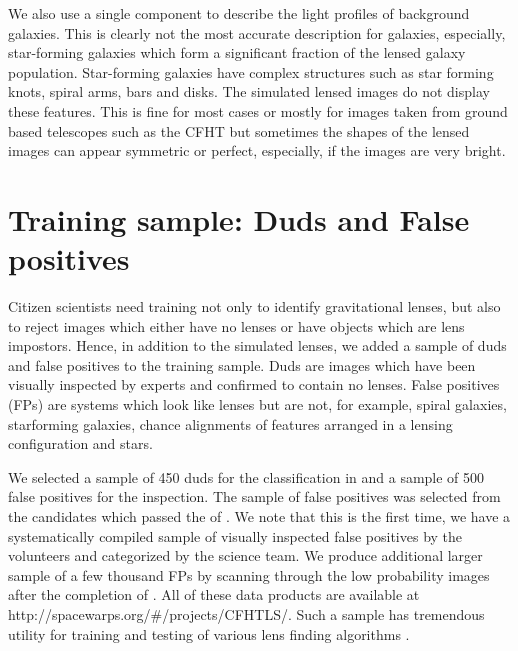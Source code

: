 \documentclass[useAMS,usenatbib,a4paper]{mn2e}
\begin{document}
We also use a single component to describe the light profiles of
background galaxies. This is clearly not the most accurate description for
galaxies, especially, star-forming galaxies which form a significant fraction
of the lensed galaxy population. Star-forming galaxies have complex structures
such as star forming knots, spiral arms, bars and disks. The simulated lensed
images do not display these features. This is fine for most cases or
mostly for images taken from ground based telescopes such as the CFHT
but sometimes the shapes of the lensed images can appear symmetric or
perfect, especially, if the images are very bright.


%


\section{Training sample: Duds and False positives}
\label{sec:dfp}

Citizen scientists need training not only to identify gravitational
lenses, but also to reject images which either have no lenses or have
objects which are lens impostors. Hence, in addition to the simulated
lenses, we added a sample of duds and false positives to the training
sample. Duds are images which have been visually inspected by experts
and confirmed to contain no lenses. False positives (FPs) are systems
which look like lenses but are not, for example, spiral galaxies,
starforming galaxies, chance alignments of features arranged in a
lensing configuration and stars.

We selected a sample of 450 duds for the \StageOne classification in \sw
and a sample of 500 false positives for the \StageTwo inspection. The
sample of false positives was selected from the candidates which passed
the \StageOne of \sw. We note that this is the first time, we have a
systematically compiled sample of visually inspected false positives by
the \sw volunteers and categorized by the science team. We produce
additional larger sample of a few thousand FPs by scanning through the
low probability images after the completion of \StageTwo. All of these
data products are available at
http://spacewarps.org/\#/projects/CFHTLS/. Such a sample has tremendous
utility for training and testing of various lens finding algorithms
\citep[e.g.,][]{Chan2014}.
\end{document}
